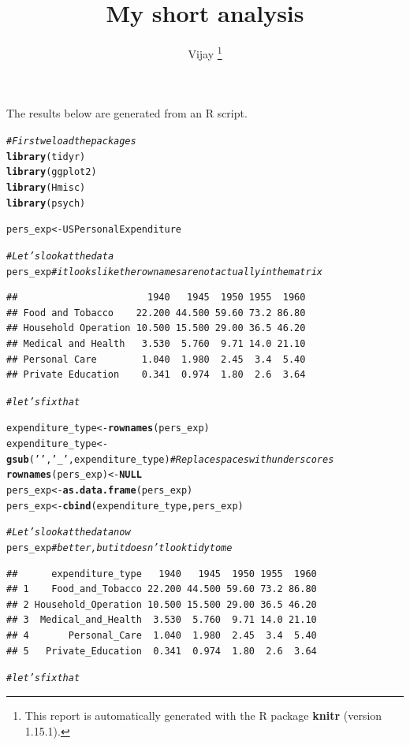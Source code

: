 \documentclass{article}\usepackage[]{graphicx}\usepackage[]{color}
\makeatletter
\newcommand{\hlstr}[1]{\textcolor[rgb]{0.192,0.494,0.8}{#1}}%
\newcommand{\hlcom}[1]{\textcolor[rgb]{0.678,0.584,0.686}{\textit{#1}}}%
\newcommand{\hlstd}[1]{\textcolor[rgb]{0.345,0.345,0.345}{#1}}%
\newcommand{\hlkwa}[1]{\textcolor[rgb]{0.161,0.373,0.58}{\textbf{#1}}}%
\newcommand{\hlkwb}[1]{\textcolor[rgb]{0.69,0.353,0.396}{#1}}%
\newcommand{\hlkwd}[1]{\textcolor[rgb]{0.737,0.353,0.396}{\textbf{#1}}}%
\newenvironment{kframe}{%
 \def\at@end@of@kframe{}%
 \ifinner\ifhmode%
  \def\at@end@of@kframe{\end{minipage}}%
  \begin{minipage}{\columnwidth}%
 \fi\fi%
 \def\FrameCommand##1{\hskip\@totalleftmargin \hskip-\fboxsep
 \colorbox{shadecolor}{##1}\hskip-\fboxsep
     \hskip-\linewidth \hskip-\@totalleftmargin \hskip\columnwidth}%
 \MakeFramed {\advance\hsize-\width
   \@totalleftmargin\z@ \linewidth\hsize
   \@setminipage}}%
 {\par\unskip\endMakeFramed%
 \at@end@of@kframe}
\newenvironment{knitrout}{}{} %
\makeatother
\begin{document}
\title{ My short analysis}

\author{ Vijay%
\thanks{This report is automatically generated with the R package \textbf{knitr}
        (version 1.15.1).}}

\maketitle
The results below are generated from an R script.

\begin{knitrout}
\color{fgcolor}\begin{kframe}
\begin{alltt}
\hlcom{# First we load the packages}
\hlkwd{library}\hlstd{(tidyr)}
\hlkwd{library}\hlstd{(ggplot2)}
\hlkwd{library}\hlstd{(Hmisc)}
\hlkwd{library}\hlstd{(psych)}

\hlstd{pers_exp} \hlkwb{<-} \hlstd{USPersonalExpenditure}

\hlcom{# Let's look at the data}
\hlstd{pers_exp}        \hlcom{#it looks like the row names are not actually in the matrix}
\end{alltt}
\begin{verbatim}
##                       1940   1945  1950 1955  1960
## Food and Tobacco    22.200 44.500 59.60 73.2 86.80
## Household Operation 10.500 15.500 29.00 36.5 46.20
## Medical and Health   3.530  5.760  9.71 14.0 21.10
## Personal Care        1.040  1.980  2.45  3.4  5.40
## Private Education    0.341  0.974  1.80  2.6  3.64
\end{verbatim}
\begin{alltt}
                \hlcom{#let's fix that}

\hlstd{expenditure_type} \hlkwb{<-} \hlkwd{rownames}\hlstd{(pers_exp)}
\hlstd{expenditure_type} \hlkwb{<-} \hlkwd{gsub}\hlstd{(} \hlstr{' '} \hlstd{,} \hlstr{'_'} \hlstd{, expenditure_type)} \hlcom{# Replace spaces with underscores}
\hlkwd{rownames}\hlstd{(pers_exp)} \hlkwb{<-} \hlkwa{NULL}
\hlstd{pers_exp} \hlkwb{<-} \hlkwd{as.data.frame}\hlstd{(pers_exp)}
\hlstd{pers_exp} \hlkwb{<-} \hlkwd{cbind}\hlstd{(expenditure_type,pers_exp)}

\hlcom{# Let's look at the data now}
\hlstd{pers_exp}        \hlcom{#better, but it doesn't look tidy to me}
\end{alltt}
\begin{verbatim}
##      expenditure_type   1940   1945  1950 1955  1960
## 1    Food_and_Tobacco 22.200 44.500 59.60 73.2 86.80
## 2 Household_Operation 10.500 15.500 29.00 36.5 46.20
## 3  Medical_and_Health  3.530  5.760  9.71 14.0 21.10
## 4       Personal_Care  1.040  1.980  2.45  3.4  5.40
## 5   Private_Education  0.341  0.974  1.80  2.6  3.64
\end{verbatim}
\begin{alltt}
                \hlcom{#let's fix that}



\end{alltt}
\end{kframe}
\end{knitrout}
\end{document}
